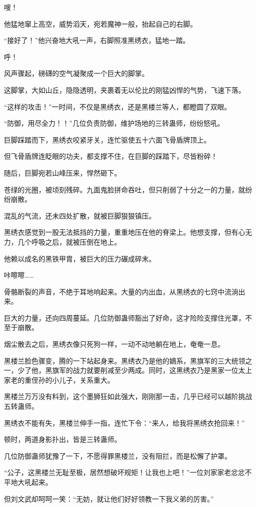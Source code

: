 \begin{this_body}
嗖！

他猛地窜上高空，威势滔天，宛若魔神一般，抬起自己的右脚。

“接好了！”他兴奋地大吼一声，右脚照准黑绣衣，猛地一踏。

呼！

风声骤起，磅礴的空气凝聚成一个巨大的脚掌。

这脚掌，大如山丘，隐隐透明，夹裹着无以伦比的刚猛凶悍的气势，飞速下落。

“这样的攻击！”一时间，不仅是黑绣衣，还是黑楼兰等人，都瞪圆了双眼。

“防御，用尽全力！！”几位负责防御，维护场地的三转蛊师，纷纷怒吼。

巨脚踩踏而下，黑绣衣咬紧牙关，连忙驱使五十六面飞骨盾牌顶上。

但飞骨盾牌连眨眼的功夫，都支撑不住，在巨脚的踩踏下，尽皆粉碎！

随后，巨脚宛若山峰压来，悍然砸下。

苍绿的光圈，被顷刻残碎。九面鬼脸拼命吞吐，但只削弱了十分之一的力量，就纷纷崩散。

混乱的气流，还未四处扩散，就被巨脚狠狠镇压。

黑绣衣感觉到一股无法抵挡的力量，重重地压在他的脊梁上。他想支撑，但有心无力，几个呼吸之后，就被压倒在地上。

他赖以成名的黑铁甲胄，被巨大的压力碾成碎末。

咔嚓嚓……

骨骼断裂的声音，不绝于耳地响起来。大量的内出血，从黑绣衣的七窍中流淌出来。

巨大的力量，还向四周蔓延。几位防御蛊师豁出了好命，这才险险支撑住光罩，不至于崩散。

烟尘散去之后，黑绣衣像只死狗一样，一动不动地躺在地上，奄奄一息。

黑楼兰脸色骤变，腾的一下站起身来。黑绣衣乃是他的嫡系，黑旗军的三大统领之一，少了他，黑旗军的战力就要削减至少两成。同时，这黑绣衣乃是黑家一位太上家老的重侄孙的小儿子，关系重大。

黑楼兰万万没有料到，这个墨狮狂如此强大，刚刚那一击，几乎已经可以越阶挑战五转蛊师。

黑绣衣不能有失，黑楼兰伸手一指，连忙下令：“来人，给我将黑绣衣抢回来！”

顿时，两道身影扑出，皆是三转蛊师。

几位防御蛊师犹豫了一下，不愿得罪黑楼兰，没有阻拦，而是松懈了护罩。

“公子，这黑楼兰无耻至极，居然想破坏规矩！让我也上吧！”一位刘家家老忿忿不平地大吼起来。

但刘文武却呵呵一笑：“无妨，就让他们好好领教一下我义弟的厉害。”


\end{this_body}

